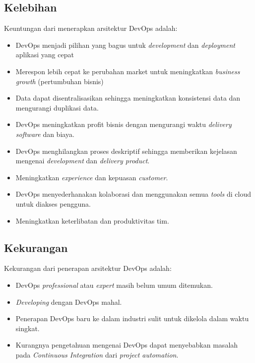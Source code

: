 \subsection{Kelebihan}
Keuntungan dari menerapkan arsitektur DevOps adalah:
\begin{itemize}
	\item DevOps menjadi pilihan yang bagus untuk \textit{development} dan \textit{deployment} aplikasi yang cepat
	\item Merespon lebih cepat ke perubahan market untuk meningkatkan \textit{business growth} (pertumbuhan bisnis)
	\item Data dapat disentralisasikan sehingga meningkatkan konsistensi data dan mengurangi duplikasi data.
	\item DevOps meningkatkan profit bisnis dengan mengurangi waktu \textit{delivery software} dan biaya.
	\item DevOps menghilangkan proses deskriptif sehingga memberikan kejelasan mengenai \textit{development} dan \textit{delivery product}.
	\item Meningkatkan \textit{experience} dan kepuasan \textit{customer}.
	\item DevOps menyederhanakan kolaborasi dan menggunakan semua \textit{tools} di cloud untuk diakses pengguna.
	\item Meningkatkan keterlibatan dan produktivitas tim.
\end{itemize}
\subsection{Kekurangan}
Kekurangan dari penerapan arsitektur DevOps adalah:
\begin{itemize}
	\item DevOps \textit{professional} atau \textit{expert} masih belum umum ditemukan.
	\item \textit{Developing} dengan DevOps mahal.
	\item Penerapan DevOps baru ke dalam industri sulit untuk dikelola dalam waktu singkat.
	\item 	Kurangnya pengetahuan mengenai DevOps dapat menyebabkan masalah pada \textit{Continuous Integration} dari \textit{project automation}.
\end{itemize}
